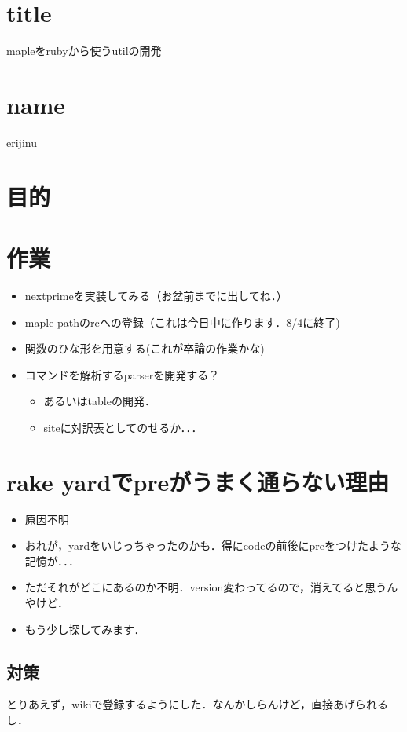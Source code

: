 \documentclass[10pt,a4j,twocolumn]{jsarticle}
\begin{document}
\section{title}
mapleをrubyから使うutilの開発

\section{name}
erijinu

\section{目的}
\section{作業}\begin{itemize}
\item nextprimeを実装してみる（お盆前までに出してね．）
\item maple pathのrcへの登録（これは今日中に作ります．8/4に終了)
\item 関数のひな形を用意する(これが卒論の作業かな)
\item コマンドを解析するparserを開発する？\begin{itemize}
\item あるいはtableの開発．
\item siteに対訳表としてのせるか．．．
\end{itemize}
\end{itemize}
\section{rake yardでpreがうまく通らない理由}\begin{itemize}
\item 原因不明
\item おれが，yardをいじっちゃったのかも．得にcodeの前後にpreをつけたような記憶が．．．
\item ただそれがどこにあるのか不明．version変わってるので，消えてると思うんやけど．
\item もう少し探してみます．
\end{itemize}
\subsection{対策}
とりあえず，wikiで登録するようにした．なんかしらんけど，直接あげられるし．
\end{document}
